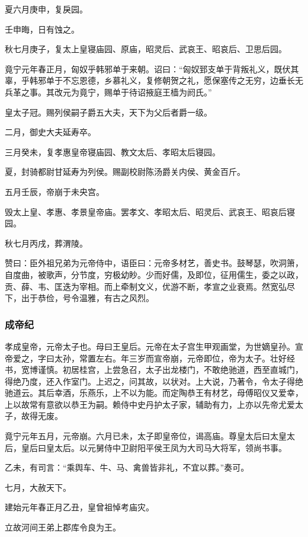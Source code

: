 \documentclass[]{article}
\begin{document}
夏六月庚申，复戾园。

壬申晦，日有蚀之。

秋七月庚子，复太上皇寝庙园、原庙，昭灵后、武哀王、昭哀后、卫思后园。

竟宁元年春正月，匈奴乎韩邪单于来朝。诏曰：``匈奴郅支单于背叛礼义，既伏其辜，乎韩邪单于不忘恩德，乡慕礼义，复修朝贺之礼，愿保塞传之无穷，边垂长无兵革之事。其改元为竟宁，赐单于待诏掖庭王樯为阏氏。''

皇太子冠。赐列侯嗣子爵五大夫，天下为父后者爵一级。

二月，御史大夫延寿卒。

三月癸未，复孝惠皇帝寝庙园、教文太后、孝昭太后寝园。

夏，封骑都尉甘延寿为列侯。赐副校尉陈汤爵关内侯、黄金百斤。

五月壬辰，帝崩于未央宫。

毁太上皇、孝惠、孝景皇帝庙。罢孝文、孝昭太后、昭灵后、武哀王、昭哀后寝园。

秋七月丙戌，葬渭陵。

赞曰：臣外祖兄弟为元帝侍中，语臣曰：元帝多材艺，善史书。鼓琴瑟，吹洞箫，自度曲，被歌声，分节度，穷极幼眇。少而好儒，及即位，征用儒生，委之以政，贡、薛、韦、匡迭为宰相。而上牵制文义，优游不断，孝宣之业衰焉。然宽弘尽下，出于恭俭，号令温雅，有古之风烈。

\hypertarget{header-n963}{%
\subsubsection{成帝纪}\label{header-n963}}

孝成皇帝，元帝太子也。母曰王皇后。元帝在太子宫生甲观画堂，为世嫡皇孙。宣帝爱之，字曰太孙，常置左右。年三岁而宣帝崩，元帝即位，帝为太子。壮好经书，宽博谨慎。初居桂宫，上尝急召，太子出龙楼门，不敢绝驰道，西至直城门，得绝乃度，还入作室门。上迟之，问其故，以状对。上大说，乃著令，令太子得绝驰道云。其后幸酒，乐燕乐，上不以为能。而定陶恭王有材艺，母傅昭仪又爱幸，上以故常有意欲以恭王为嗣。赖侍中史丹护太子家，辅助有力，上亦以先帝尤爱太子，故得无废。

竟宁元年五月，元帝崩。六月已未，太子即皇帝位，谒高庙。尊皇太后曰太皇太后，皇后曰皇太后。以元舅侍中卫尉阳平侯王凤为大司马大将军，领尚书事。

乙未，有司言：``乘舆车、牛、马、禽兽皆非礼，不宜以葬。''奏可。

七月，大赦天下。

建始元年春正月乙丑，皇曾祖悼考庙灾。

立故河间王弟上郡库令良为王。
\end{document}
